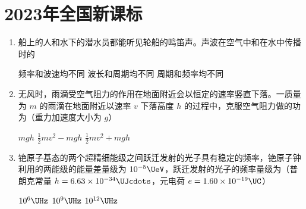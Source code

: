 \documentclass[\gkver]{gaokaozhenti}
\begin{document}
\chapter{2023年全国新课标}

\begin{enumerate}
\item
船上的人和水下的潜水员都能听见轮船的鸣笛声。声波在空气中和在水中传播时的

{频率和波速均不同}
{波长和周期均不同}
{周期和频率均不同}


\item
无风时，雨滴受空气阻力的作用在地面附近会以恒定的速率竖直下落。一质量为 $m$ 的雨滴在地面附近以速率 $v$ 下落高度 $h$ 的过程中，克服空气阻力做的功为（重力加速度大小为 $g$）

{$mgh$}
{$\frac{1}{2}mv^{2} - mgh$}
{$\frac{1}{2}mv^{2} + mgh$}


\item
铯原子基态的两个超精细能级之间跃迁发射的光子具有稳定的频率，铯原子钟利用的两能级的能量差量级为 $10^{-5} \UeV$，跃迁发射的光子的频率量级为（普朗克常量 $h = 6.63\times10^{-34} \UJcdots$，元电荷 $e = 1.60\times10^{-19} \UC$）

{$10^{6} \UHz$}
{$10^{9} \UHz$}
{$10^{12} \UHz$}


\end{enumerate}
\end{document}
